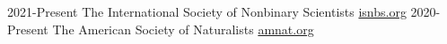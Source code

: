 \documentclass[9pt]{developercv} %
\begin{document}
\vspace{-10 pt}
\begin{entrylist}
    \vspace{-10 pt}
    \entry
    {2021-Present}
    {The International Society of Nonbinary Scientists}
    {\href{https://isnbs.org/}{isnbs.org}}
    {}
    \vspace{-10 pt}
    \entry
    {2020-Present}
    {The American Society of Naturalists}
    {\href{https://www.amnat.org/home.html}{amnat.org}}
    {}
\end{entrylist}

\end{document}
